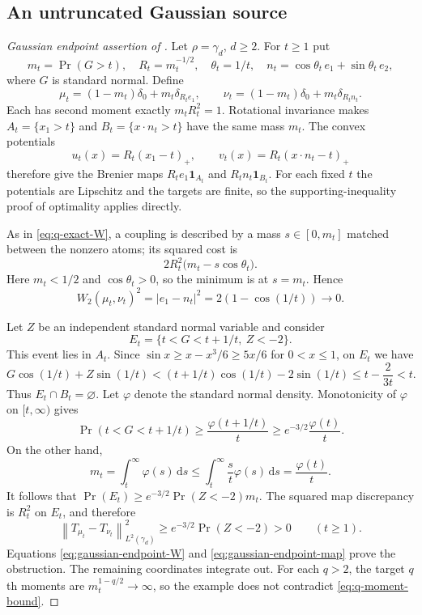 \documentclass[11pt]{article}
\numberwithin{equation}{section}
\theoremstyle{remark}
\newcommand{\ind}{\mathbf 1}
\newcommand{\dd}{\,\mathrm d}
\newcommand{\norm}[1]{\left\lVert #1\right\rVert}
\begin{document}
\subsection{An untruncated Gaussian source}
\begin{proof}[Gaussian endpoint assertion of ]
Let $\rho=\gamma_d$, $d\ge2$. For $t\ge1$ put
\[
 m_t=\Pr(G>t),\quad R_t=m_t^{-1/2},\quad
 \theta_t=1/t,\quad n_t=\cos\theta_t\,e_1+\sin\theta_t\,e_2,
\]
where $G$ is standard normal. Define
\[
 \mu_t=(1-m_t)\delta_0+m_t\delta_{R_te_1},\qquad
 \nu_t=(1-m_t)\delta_0+m_t\delta_{R_tn_t}.
\]
Each has second moment exactly $m_tR_t^2=1$. Rotational invariance makes
$A_t=\{x_1>t\}$ and $B_t=\{x\cdot n_t>t\}$ have the same mass $m_t$. The convex potentials
\[
 u_t(x)=R_t(x_1-t)_+,\qquad v_t(x)=R_t(x\cdot n_t-t)_+
\]
therefore give the Brenier maps $R_te_1\ind_{A_t}$ and $R_tn_t\ind_{B_t}$. For each fixed $t$ the potentials are Lipschitz and the targets are finite, so the supporting-inequality proof of optimality applies directly.

As in \eqref{eq:q-exact-W}, a coupling is described by a mass $s\in[0,m_t]$ matched between the nonzero atoms; its squared cost is
\[
 2R_t^2\bigl(m_t-s\cos\theta_t\bigr).
\]
Here $m_t<1/2$ and $\cos\theta_t>0$, so the minimum is at $s=m_t$. Hence
\begin{equation}\label{eq:gaussian-endpoint-W}
 W_2(\mu_t,\nu_t)^2=|e_1-n_t|^2=2(1-\cos(1/t))\longrightarrow0.
\end{equation}

Let $Z$ be an independent standard normal variable and consider
\[
 E_t=\{t<G<t+1/t,\ Z<-2\}.
\]
This event lies in $A_t$. Since $\sin x\ge x-x^3/6\ge5x/6$ for $0<x\le1$, on $E_t$ we have
\[
 G\cos(1/t)+Z\sin(1/t)
 <(t+1/t)\cos(1/t)-2\sin(1/t)
 \le t-\frac{2}{3t}<t.
\]
Thus $E_t\cap B_t=\varnothing$. Let $\varphi$ denote the standard normal density. Monotonicity of $\varphi$ on $[t,\infty)$ gives
\[
 \Pr(t<G<t+1/t)\ge\frac{\varphi(t+1/t)}t
 \ge e^{-3/2}\frac{\varphi(t)}t.
\]
On the other hand,
\[
 m_t=\int_t^\infty\varphi(s)\dd s
 \le\int_t^\infty\frac{s}{t}\varphi(s)\dd s
 =\frac{\varphi(t)}t.
\]
It follows that $\Pr(E_t)\ge e^{-3/2}\Pr(Z<-2)m_t$. The squared map discrepancy is $R_t^2$ on $E_t$, and therefore
\begin{equation}\label{eq:gaussian-endpoint-map}
 \norm{T_{\mu_t}-T_{\nu_t}}_{L^2(\gamma_d)}^2
 \ge e^{-3/2}\Pr(Z<-2)>0\qquad(t\ge1).
\end{equation}
Equations \eqref{eq:gaussian-endpoint-W} and \eqref{eq:gaussian-endpoint-map} prove the obstruction. The remaining coordinates integrate out. For each $q>2$, the target $q$th moments are $m_t^{1-q/2}\to\infty$, so the example does not contradict \eqref{eq:q-moment-bound}.
\end{proof}
\end{document}
